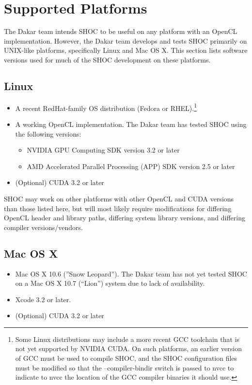\documentclass[11pt]{article}
\begin{document}
\section{Supported Platforms}\label{sec:supported}

The Dakar team intends SHOC to be useful on any platform with an
OpenCL implementation. However, the Dakar team develops and tests
SHOC primarily on UNIX-like platforms, specifically Linux and
Mac OS X.
This section lists software versions used for much of the SHOC development
on these platforms.

\subsection{Linux}

\begin{itemize}
\item A recent RedHat-family OS distribution (Fedora or RHEL).\footnote{
Some Linux distributions may include a more recent GCC toolchain that is
not yet supported by NVIDIA CUDA.  On such platforms, an earlier version of GCC
must be used to compile SHOC, and the SHOC configuration files must be
modified so that the --compiler-bindir switch is passed to nvcc to 
indicate to nvcc the location of the GCC compiler binaries it should use.}
\item A working OpenCL implementation. The Dakar team has tested SHOC
using the following versions:
    \begin{itemize}
        \item NVIDIA GPU Computing SDK version 3.2 or later
        \item AMD Accelerated Parallel Processing (APP) SDK version 2.5 or later
    \end{itemize}
\item (Optional) CUDA 3.2 or later
\end{itemize}

SHOC may work on other platforms with other OpenCL and CUDA versions
than those listed here, but will most likely require modifications for
differing OpenCL header and library paths, differing system library versions,
and differing compiler versions/vendors.

\subsection{Mac OS X}

\begin{itemize}
\item Mac OS X 10.6 (''Snow Leopard'').  The Dakar team has not yet tested SHOC on a Mac OS X 10.7 (``Lion'') system due to lack of availability.
\item Xcode 3.2 or later.
\item (Optional) CUDA 3.2 or later
\end{itemize}
\end{document}
